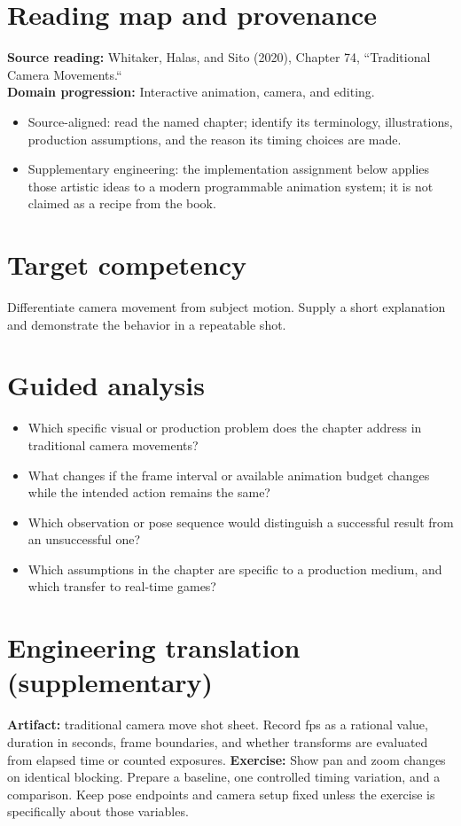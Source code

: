 \documentclass[10pt,letterpaper]{article}
\begin{document}
\makedoctitle
\makedocsummary

\section{Reading map and provenance}
\textbf{Source reading:} Whitaker, Halas, and Sito (2020), Chapter 74, ``Traditional Camera Movements.``\\
\textbf{Domain progression:} Interactive animation, camera, and editing.
\begin{itemize}
\item Source-aligned: read the named chapter; identify its terminology, illustrations, production assumptions, and the reason its timing choices are made.
\item Supplementary engineering: the implementation assignment below applies those artistic ideas to a modern programmable animation system; it is not claimed as a recipe from the book.
\end{itemize}
\section{Target competency}
Differentiate camera movement from subject motion. Supply a short explanation and demonstrate the behavior in a repeatable shot.
\section{Guided analysis}
\begin{itemize}
\item Which specific visual or production problem does the chapter address in traditional camera movements?
\item What changes if the frame interval or available animation budget changes while the intended action remains the same?
\item Which observation or pose sequence would distinguish a successful result from an unsuccessful one?
\item Which assumptions in the chapter are specific to a production medium, and which transfer to real-time games?
\end{itemize}
\section{Engineering translation (supplementary)}
\textbf{Artifact:} traditional camera move shot sheet. Record fps as a rational value, duration in seconds, frame boundaries, and whether transforms are evaluated from elapsed time or counted exposures.
\textbf{Exercise:} Show pan and zoom changes on identical blocking. Prepare a baseline, one controlled timing variation, and a comparison. Keep pose endpoints and camera setup fixed unless the exercise is specifically about those variables.
\end{document}
